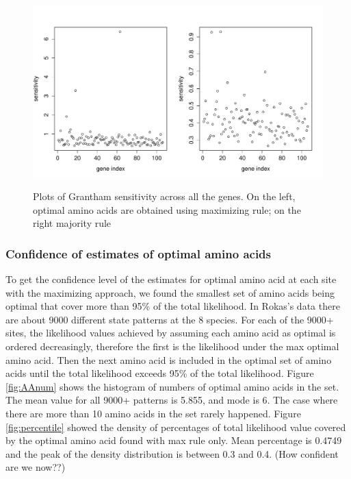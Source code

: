 \documentclass[13pt]{article}
\begin{document}
\begin{figure}[h]
\caption{Plots of Grantham sensitivity across all the genes.
On the left, optimal amino acids are obtained using maximizing rule; on the right majority rule}
\centering
\includegraphics[width=\textwidth]{gvalue.pdf}
\label{fig:gvalue}
\end{figure}


\subsubsection{Confidence of estimates of optimal amino acids}
To get the confidence level of the estimates for optimal amino acid at each site with the maximizing approach, we found the smallest set of amino acids being optimal that cover more than 95\% of the total likelihood.
In Rokas's data there are about 9000 different state patterns at the 8 species.
For each of the 9000+ sites, the likelihood values achieved by assuming each amino acid as optimal is ordered decreasingly, therefore the first is the likelihood under the max optimal amino acid.
Then the next amino acid is included in the optimal set of amino acids until the total likelihood exceeds 95\% of the total likelihood.
Figure \ref{fig:AAnum} shows the histogram of numbers of optimal amino acids in the set.
The mean value for all 9000+ patterns is 5.855, and mode is 6.
The case where there are more than 10 amino acids in the set rarely happened.
Figure \ref{fig:percentile} showed the density of percentages of total likelihood value covered by the optimal amino acid found with max rule only.
Mean percentage is 0.4749 and the peak of the density distribution is between 0.3 and 0.4. (How confident are we now??)
\end{document}
